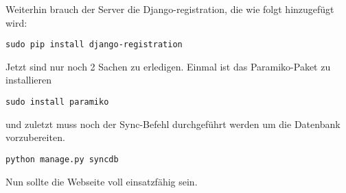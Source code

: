 Weiterhin brauch der Server die Django-registration, die wie folgt hinzugefügt wird:
\begin{lstlisting}
sudo pip install django-registration
\end{lstlisting}
Jetzt sind nur noch 2 Sachen zu erledigen. Einmal ist das Paramiko-Paket zu installieren 
\begin{lstlisting}
sudo install paramiko
\end{lstlisting}
und zuletzt muss noch der Sync-Befehl durchgeführt werden um die Datenbank vorzubereiten.
\begin{lstlisting}
python manage.py syncdb
\end{lstlisting}
Nun sollte die Webseite voll einsatzfähig sein.
